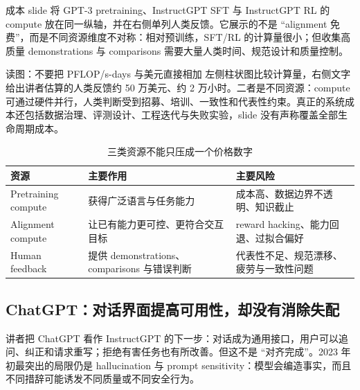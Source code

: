成本 slide 将 GPT-3 pretraining、InstructGPT SFT 与 InstructGPT RL 的 compute 放在同一纵轴，并在右侧单列人类反馈。它展示的不是 ``alignment 免费''，而是不同资源维度不对称：相对预训练，SFT/RL 的计算量很小；但收集高质量 demonstrations 与 comparisons 需要大量人类时间、规范设计和质量控制。


\begin{knowledgebox}{读图：不要把 PFLOP/s-days 与美元直接相加}
左侧柱状图比较计算量，右侧文字给出讲者估算的人类反馈约 50 万美元、约 2 万小时。二者是不同资源：compute 可通过硬件并行，人类判断受到招募、培训、一致性和代表性约束。真正的系统成本还包括数据治理、评测设计、工程迭代与失败实验，slide 没有声称覆盖全部生命周期成本。
\end{knowledgebox}

\begin{table}[H]
\centering
\caption{三类资源不能只压成一个价格数字}
\begin{tabularx}{\textwidth}{L{2.9cm} X X}
\toprule
资源 & 主要作用 & 主要风险 \\
\midrule
Pretraining compute & 获得广泛语言与任务能力 & 成本高、数据边界不透明、知识截止 \\
Alignment compute & 让已有能力更可控、更符合交互目标 & reward hacking、能力回退、过拟合偏好 \\
Human feedback & 提供 demonstrations、comparisons 与错误判断 & 代表性不足、规范漂移、疲劳与一致性问题 \\
\bottomrule
\end{tabularx}
\end{table}

\subsection{ChatGPT：对话界面提高可用性，却没有消除失配}

讲者把 ChatGPT 看作 InstructGPT 的下一步：对话成为通用接口，用户可以追问、纠正和请求重写；拒绝有害任务也有所改善。但这不是 ``对齐完成''。2023 年初最突出的局限仍是 hallucination 与 prompt sensitivity：模型会编造事实，而且不同措辞可能诱发不同质量或不同安全行为。


